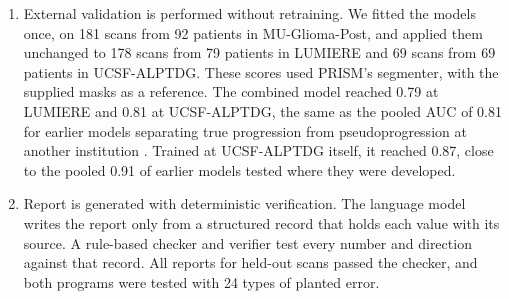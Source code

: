 \documentclass[largeformat]{interact} %
\begin{document}
\begin{enumerate}
group of inputs to the score, as its share of each scan's score and as the fall in AUC when it is left out. At MU-Glioma-Post, the combined model reached an AUC of 0.82 in repeated cross validation. A radiomics model
published on this cohort reported 0.80 on one held-out set of 30 patients \citep{christodoulou2026}. On that same
held-out set, PRISM reached 0.85, and the published model, rerun with its authors' code on our label, 0.59. Because
one small held-out set gives an unstable AUC, we also repeated this design on 100 random held-out sets, where PRISM averaged 0.84 and reached up to 1.00.
\item External validation is performed without retraining. We fitted the models once, on 181 scans from 92 patients in
MU-Glioma-Post, and applied them unchanged to 178 scans from 79 patients in LUMIERE and 69 scans from 69 patients in
UCSF-ALPTDG. These scores used PRISM's segmenter, with the supplied masks as a reference. The combined model reached 0.79 at LUMIERE and 0.81 at UCSF-ALPTDG, the same as the pooled AUC of 0.81 for earlier models separating true progression from pseudoprogression
at another institution \citep{zhang2026meta}. Trained at UCSF-ALPTDG itself, it reached
0.87, close to the pooled 0.91 of earlier models tested where they were developed.
\item Report is generated with deterministic verification. The language model writes the report only from a structured record that holds each value with its source. A rule-based
checker and verifier test every number and direction against that record. All reports for held-out scans passed the
checker, and both programs were tested with 24 types of planted error.
\end{enumerate}
\end{document}
